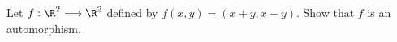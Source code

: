 Let $f : \R^2 \longrightarrow \R^2$ defined by $f(x,y) = (x+y, x-y)$. Show that $f$ is an automorphism.